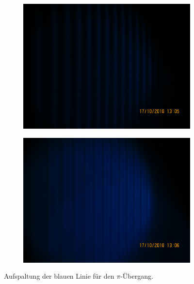 \begin{figure}
 \begin{subfigure}[c]{0.5\textwidth}
   \includegraphics[width=\textwidth]{Bild8.JPG}
 \end{subfigure}
 \begin{subfigure}[c]{0.5\textwidth}
   \includegraphics[width=\textwidth]{Bild9.JPG}
 \end{subfigure}
 \caption{Aufspaltung der blauen Linie für den $\pi$-Übergang.}
\end{figure}

